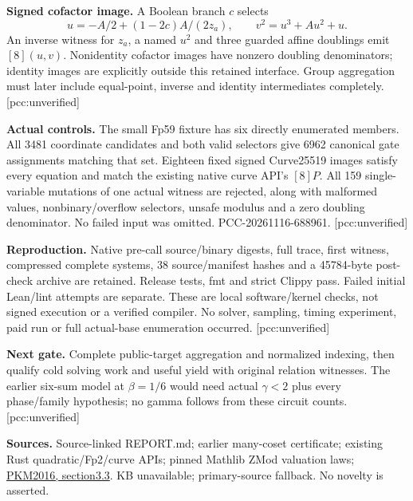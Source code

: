 \documentclass[10pt]{article}
\begin{document}
\textbf{Signed cofactor image.} A Boolean branch $c$ selects
\[
 u=-A/2+(1-2c)A/(2z_a),\qquad v^2=u^3+Au^2+u.
\]
An inverse witness for $z_a$, a named $u^2$ and three guarded affine
doublings emit $[8](u,v)$. Nonidentity cofactor images have nonzero
doubling denominators; identity images are explicitly outside this retained
interface. Group aggregation must later include equal-point, inverse and
identity intermediates completely. [pcc:unverified]

\textbf{Actual controls.} The small Fp59 fixture has six directly
enumerated members. All 3481 coordinate candidates and both valid selectors
give 6962 canonical gate assignments matching that set. Eighteen fixed signed
Curve25519 images satisfy every equation and match the existing native
curve API's $[8]P$. All 159 single-variable mutations of one actual witness
are rejected, along with malformed values, nonbinary/overflow selectors,
unsafe modulus and a zero doubling denominator. No failed input was omitted.
PCC-20261116-688961. [pcc:unverified]

\textbf{Reproduction.} Native pre-call source/binary digests, full trace,
first witness, compressed complete systems, 38 source/manifest hashes and a
45784-byte post-check archive are retained. Release tests, fmt and strict
Clippy pass. Failed initial Lean/lint attempts are separate. These are local
software/kernel checks, not signed execution or a verified compiler.
No solver, sampling, timing experiment, paid run or full actual-base
enumeration occurred. [pcc:unverified]

\textbf{Next gate.} Complete public-target aggregation and normalized
indexing, then qualify cold solving work and useful yield with original
relation witnesses. The earlier six-sum model at $\beta=1/6$ would need
actual $\gamma<2$ plus every phase/family hypothesis; no gamma follows
from these circuit counts. [pcc:unverified]

\textbf{Sources.} Source-linked REPORT.md; earlier many-coset certificate;
existing Rust quadratic/Fp2/curve APIs; pinned Mathlib ZMod valuation laws;
\href{https://people.maths.ox.ac.uk/petit/files/16PKC_primeECDLP.pdf}{PKM2016,
section3.3}. KB unavailable; primary-source fallback. No novelty is asserted.
\end{document}
